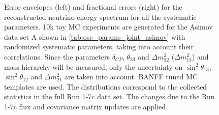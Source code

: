 \begin{figure}[htb]
\caption {
Error envelopes (left) and fractional errors (right) for the reconstructed neutrino energy spectrum
for all the systematic parameters.
10k toy MC experiments are generated for the Asimov data set A shown in \cref{tab:osc_params_joint_asimov}
with randomized systematic parameters, taking into account their correlations.
Since the parameters $\delta_{CP}$, $\theta_{23}$ and $\Delta m^2_{32}$ ($\Delta m^2_{13}$) and mass hierarchy
will be measured,
only the uncertainty on 
$\sin^2 \theta_{13}$,
$\sin^2 \theta_{12}$
and 
$\Delta m^2_{21}$ 
are taken into account.
BANFF tuned MC templates are used. 
The distributions correspond to the collected statistics in the full Run 1-7c data set.
The changes due to the Run 1-7c flux and covariance matrix updates are applied.
}
\label{fig:spectra_systematic_Asimov_A_run17c}
\end{figure}





